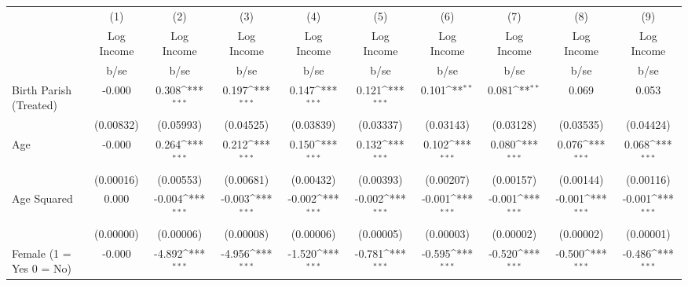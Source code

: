 {
\def\sym#1{\ifmmode^{#1}\else\(^{#1}\)\fi}
\begin{tabular}{l*{9}{c}}
\hline\hline
                    &\multicolumn{1}{c}{(1)}&\multicolumn{1}{c}{(2)}&\multicolumn{1}{c}{(3)}&\multicolumn{1}{c}{(4)}&\multicolumn{1}{c}{(5)}&\multicolumn{1}{c}{(6)}&\multicolumn{1}{c}{(7)}&\multicolumn{1}{c}{(8)}&\multicolumn{1}{c}{(9)}\\
                    &\multicolumn{1}{c}{Log Income}&\multicolumn{1}{c}{Log Income}&\multicolumn{1}{c}{Log Income}&\multicolumn{1}{c}{Log Income}&\multicolumn{1}{c}{Log Income}&\multicolumn{1}{c}{Log Income}&\multicolumn{1}{c}{Log Income}&\multicolumn{1}{c}{Log Income}&\multicolumn{1}{c}{Log Income}\\
                    &        b/se         &        b/se         &        b/se         &        b/se         &        b/se         &        b/se         &        b/se         &        b/se         &        b/se         \\
\hline
Birth Parish (Treated)&      -0.000         &       0.308\sym{***}&       0.197\sym{***}&       0.147\sym{***}&       0.121\sym{***}&       0.101\sym{**} &       0.081\sym{**} &       0.069         &       0.053         \\
                    &   (0.00832)         &   (0.05993)         &   (0.04525)         &   (0.03839)         &   (0.03337)         &   (0.03143)         &   (0.03128)         &   (0.03535)         &   (0.04424)         \\
Age                 &      -0.000         &       0.264\sym{***}&       0.212\sym{***}&       0.150\sym{***}&       0.132\sym{***}&       0.102\sym{***}&       0.080\sym{***}&       0.076\sym{***}&       0.068\sym{***}\\
                    &   (0.00016)         &   (0.00553)         &   (0.00681)         &   (0.00432)         &   (0.00393)         &   (0.00207)         &   (0.00157)         &   (0.00144)         &   (0.00116)         \\
Age Squared         &       0.000         &      -0.004\sym{***}&      -0.003\sym{***}&      -0.002\sym{***}&      -0.002\sym{***}&      -0.001\sym{***}&      -0.001\sym{***}&      -0.001\sym{***}&      -0.001\sym{***}\\
                    &   (0.00000)         &   (0.00006)         &   (0.00008)         &   (0.00006)         &   (0.00005)         &   (0.00003)         &   (0.00002)         &   (0.00002)         &   (0.00001)         \\
Female (1 = Yes 0 = No)&      -0.000         &      -4.892\sym{***}&      -4.956\sym{***}&      -1.520\sym{***}&      -0.781\sym{***}&      -0.595\sym{***}&      -0.520\sym{***}&      -0.500\sym{***}&      -0.486\sym{***}\\

\end{tabular}}
